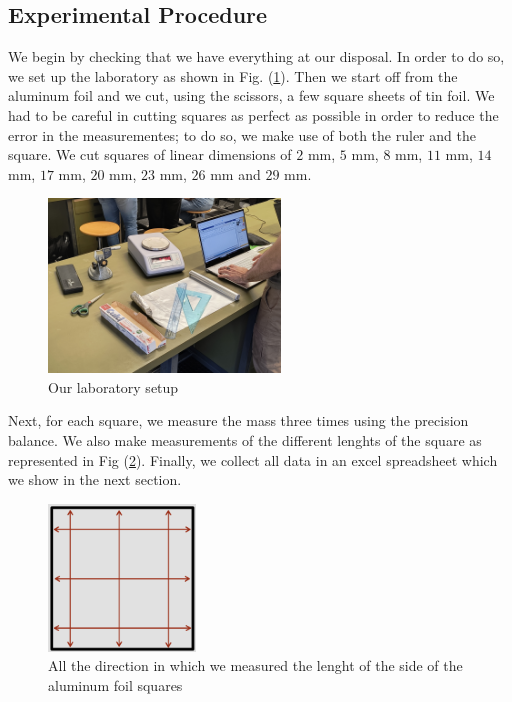 \documentclass[a4paper,12pt]{article}
\begin{document}
\subsection{Experimental Procedure}
\label{subsec:exp_procedure}
We begin by checking that we have everything at our disposal. In order to do so, we set up the laboratory as shown in Fig. (\ref{fig:lab_instr}).
Then we start off from the aluminum foil and we cut, using the scissors, a few square sheets of tin foil. 
We had to be careful in cutting squares as perfect as possible in order to reduce the error in 
the measurementes; to do so, we make use of both the ruler and the square. We cut squares of linear 
dimensions of $2$ mm, $5$ mm, $8$ mm, $11$ mm, $14$ mm, $17$ mm, $20$ mm, $23$ mm, $26$ mm and $29$ mm.

\begin{figure}[h]
    \centering
    \includegraphics[width = 0.55\textwidth]{Lab_instruments.jpg}
    \caption{Our laboratory setup}
    \label{fig:lab_instr}
\end{figure}

Next, for each square, we measure the mass three times using the precision balance. We also make measurements of the different 
lenghts of the square as represented in Fig (\ref{fig:sq_measure}). Finally, we collect all data in an excel spreadsheet which we show in the next section.
\begin{figure}[h]
    \centering
    \includegraphics[width = 0.35\textwidth]{square_measure.png}
    \caption{All the direction in which we measured the lenght of the side of the aluminum foil squares} 
    \label{fig:sq_measure}
\end{figure}
\end{document}
